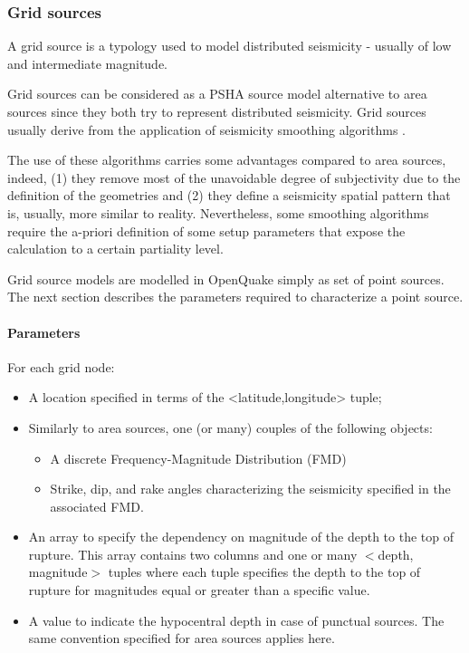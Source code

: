 \subsubsection{Grid sources}
A grid source is a typology used to model distributed seismicity - usually 
of low and intermediate magnitude.

Grid sources can be considered as a PSHA source model alternative to area 
sources since they both try to represent distributed seismicity. Grid sources 
usually derive from the application of seismicity smoothing algorithms 
\citep{frankel1995,woo1996}. 

The use of these algorithms carries some advantages compared to area sources, 
indeed, (1) they remove most of the unavoidable degree of subjectivity due to 
the definition of the geometries and (2) they define a seismicity spatial 
pattern that is, usually, more similar to reality. Nevertheless, some smoothing 
algorithms require the a-priori definition of some setup parameters that expose 
the calculation to a certain partiality level.

Grid source models are modelled in OpenQuake simply as set of 
point sources. The next section describes the parameters required to 
characterize a point source.
%
\paragraph{Parameters}
%
For each grid node:
\begin{itemize}
\item A location specified in terms of the <latitude,longitude> tuple;
\item Similarly to area sources, one (or many) couples of the following objects:
	\begin{itemize}
	\item A discrete Frequency-Magnitude Distribution (FMD)
	\item Strike, dip, and rake angles characterizing the seismicity specified 
	in the associated FMD. 
	\end{itemize}
\item An array to specify the dependency on magnitude of the depth to the top of 
	rupture. This array contains two columns and one or many 
	$<$depth, magnitude$>$ tuples where each tuple specifies the depth to the 
	top of rupture for magnitudes equal or greater than a specific value. 
\item A value to indicate the hypocentral depth in case of punctual sources. The 
	same convention specified for area sources applies here. 
\end{itemize}
